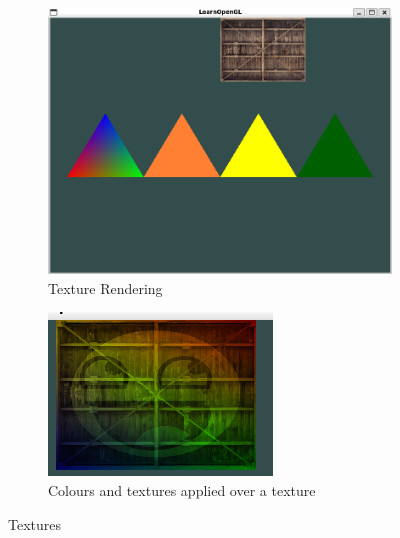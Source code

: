 \documentclass[12pt]{article}
\begin{document}
    \begin{figure}[H]
        \centering
        \begin{subfigure}[b]{0.45\textwidth}
            \centering
            \includegraphics[width=\textwidth]{openGL4TrianglesBox.png}
            \caption{Texture Rendering}
        \end{subfigure}
        \hfill
        \begin{subfigure}[b]{0.45\textwidth}
            \centering
            \includegraphics[width=\textwidth]{openGLLayeredTexturesAndColour.png}
            \caption{Colours and textures applied over a texture}
        \end{subfigure}
        \caption{Textures}
    \end{figure}
\end{document}
